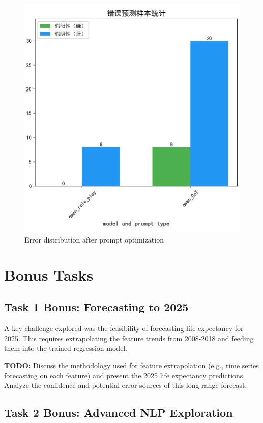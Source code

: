 \documentclass{article}
\begin{document}
\begin{figure}[h]
    \centering
    \includegraphics[width=1\columnwidth]{pic/T2P2B2.2.png}
    \caption{Error distribution after prompt optimization}
    \label{fig:error_analysis}
\end{figure}

\section{Bonus Tasks}
\label{sec:bonus}

\subsection{Task 1 Bonus: Forecasting to 2025}
A key challenge explored was the feasibility of forecasting life expectancy for 2025. This requires extrapolating the feature trends from 2008-2018 and feeding them into the trained regression model.

\textbf{TODO:} Discuss the methodology used for feature extrapolation (e.g., time series forecasting on each feature) and present the 2025 life expectancy predictions. Analyze the confidence and potential error sources of this long-range forecast.

\subsection{Task 2 Bonus: Advanced NLP Exploration}
\end{document}

